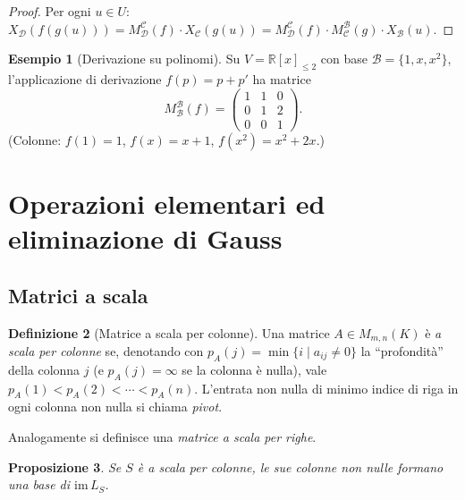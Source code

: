 \documentclass[11pt, a4paper]{book}
\theoremstyle{definition}
\newtheorem{definizione}{Definizione}[section]
\newtheorem{esempio}[definizione]{Esempio}
\theoremstyle{plain}
\newtheorem{proposizione}[definizione]{Proposizione}
\theoremstyle{remark}
\newcommand{\R}{\mathbb{R}}
\newcommand{\im}{\mathrm{im}\,}
\begin{document}
\begin{proof}
Per ogni $u \in U$: $X_\mathcal{D}(f(g(u))) = M^\mathcal{C}_\mathcal{D}(f) \cdot X_\mathcal{C}(g(u)) = M^\mathcal{C}_\mathcal{D}(f) \cdot M^\mathcal{B}_\mathcal{C}(g) \cdot X_\mathcal{B}(u)$.
\end{proof}

\begin{exbox}
\begin{esempio}[Derivazione su polinomi]
Su $V = \R[x]_{\leq 2}$ con base $\mathcal{B} = \{1, x, x^2\}$, l'applicazione di derivazione $f(p) = p + p'$ ha matrice
\[
  M^\mathcal{B}_\mathcal{B}(f) = \begin{pmatrix} 1 & 1 & 0 \\ 0 & 1 & 2 \\ 0 & 0 & 1 \end{pmatrix}.
\]
(Colonne: $f(1)=1$, $f(x)=x+1$, $f(x^2)=x^2+2x$.)
\end{esempio}
\end{exbox}

\section{Operazioni elementari ed eliminazione di Gauss}
\label{sec:gauss}

\subsection{Matrici a scala}

\begin{defbox}
\begin{definizione}[Matrice a scala per colonne]
Una matrice $A \in M_{m,n}(K)$ è \emph{a scala per colonne} se, denotando con $p_A(j) = \min\{i \mid a_{ij} \neq 0\}$ la ``profondità'' della colonna $j$ (e $p_A(j) = \infty$ se la colonna è nulla), vale $p_A(1) < p_A(2) < \cdots < p_A(n)$. L'entrata non nulla di minimo indice di riga in ogni colonna non nulla si chiama \emph{pivot}.
\end{definizione}
\end{defbox}

Analogamente si definisce una \emph{matrice a scala per righe}.

\begin{proposizione}
Se $S$ è a scala per colonne, le sue colonne non nulle formano una base di $\im L_S$.
\end{proposizione}
\end{document}
